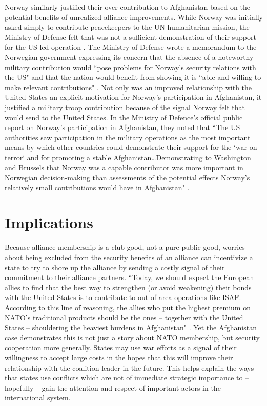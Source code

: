 \documentclass[12pt,letterpaper]{article}
\begin{document}
		Norway similarly justified their over-contribution to Afghanistan based on the potential benefits of unrealized alliance improvements. While Norway was initially asked simply to contribute peacekeepers to the UN humanitarian mission, the Ministry of Defense felt that was not a sufficient demonstration of their support for the US-led operation \citep{ministryofdefenceiisecuritypolicy_mulignorskubatstotte_2001}. The Ministry of Defense wrote a memorandum to the Norwegian government expressing its concern that the absence of a noteworthy military contribution would ``pose problems for Norway's security relations with the US" and that the nation would benefit from showing it is ``able and willing to make relevant contributions" \citep{ministryofdefenceiisecuritypolicy_muligenorskemilitaere_2001}. Not only was an improved relationship with the United States an explicit motivation for Norway's participation in Afghanistan, it justified a military troop contribution because of the signal Norway felt that would send to the United States. In the Ministry of Defence's official public report on Norway's participation in Afghanistan, they noted that ``The US authorities saw participation in the military operations as the most important means by which other countries could demonstrate their support for the `war on terror` and for promoting a stable Afghanistan\ldots Demonstrating to Washington and Brussels that Norway was a capable contributor was more important in Norwegian decision-making than assessments of the potential effects Norway's relatively small contributions would have in Afghanistan" \citep[214-216]{godal_goodallynorway_2016}.

\section{Implications}
	Because alliance membership is a club good, not a pure public good, worries about being excluded from the security benefits of an alliance can incentivize a state to try to shore up the alliance by sending a costly signal of their commitment to their alliance partners. ``Today, we should expect the European allies to find that the best way to strengthen (or avoid weakening) their bonds with the United States is to contribute to out-of-area operations like ISAF. According to this line of reasoning, the allies who put the highest premium on NATO’s traditional products should be the ones – together with the United States – shouldering the heaviest burdens in Afghanistan" \citep[331]{ringsmose_natoburdensharingredux_2010}. Yet the Afghanistan case demonstrates this is not just a story about NATO membership, but security cooperation more generally. States may use war efforts as a signal of their willingness to accept large costs in the hopes that this will improve their relationship with the coalition leader in the future. This helps explain the ways that states use conflicts which are not of immediate strategic importance to -- hopefully -- gain the attention and respect of important actors in the international system.
\end{document}
